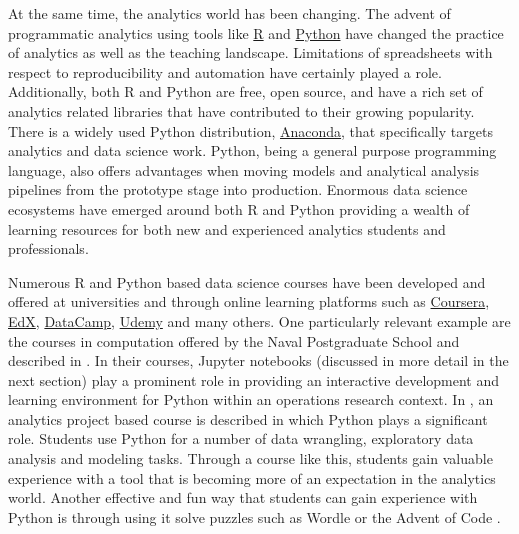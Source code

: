 \documentclass[ited]{informs3}                      %
\begin{document}
At the same time, the analytics world has been changing. The advent of programmatic analytics using tools like \href{https://www.r-project.org/}{R} and \href{https://www.python.org/}{Python} have changed the practice of analytics as well as the teaching landscape. Limitations of spreadsheets with respect to reproducibility and automation have certainly played a role.  Additionally, both R and Python are free, open source, and have a rich set of analytics related libraries that have contributed to their growing popularity. There is a widely used Python distribution, \href{https://www.anaconda.com/download}{Anaconda}, that specifically targets analytics and data science work. Python, being a general purpose programming language, also offers advantages when moving models and analytical analysis pipelines from the prototype stage into production. Enormous data science ecosystems have emerged around both R and Python providing a wealth of learning resources for both new and experienced analytics students and professionals.

Numerous R and Python based data science courses have been developed and offered at universities and through online learning platforms such as \href{https://www.coursera.org/browse/data-science}{Coursera}, \href{https://www.edx.org/learn/data-science}{EdX}, \href{https://www.datacamp.com/}{DataCamp}, \href{https://www.udemy.com/topic/data-analysis/}{Udemy} and many others. One particularly relevant example are the courses in computation offered by the Naval Postgraduate School and described in \citet{alderson2022:interactive_computing}. In their courses, Jupyter notebooks (discussed in more detail in the next section) play a prominent role in providing an interactive development and learning environment for Python within an operations research context. In \citet{pythonprojects:ite}, an analytics project based course is described in which Python plays a significant role. Students use Python for a number of data wrangling, exploratory data analysis and modeling tasks. Through a course like this, students gain valuable experience with a tool that is becoming more of an expectation in the analytics world. Another effective and fun way that students can gain experience with Python is through using it solve puzzles such as Wordle \citep{wordle_2023} or the Advent of Code \citep{AOC}.
\end{document}
